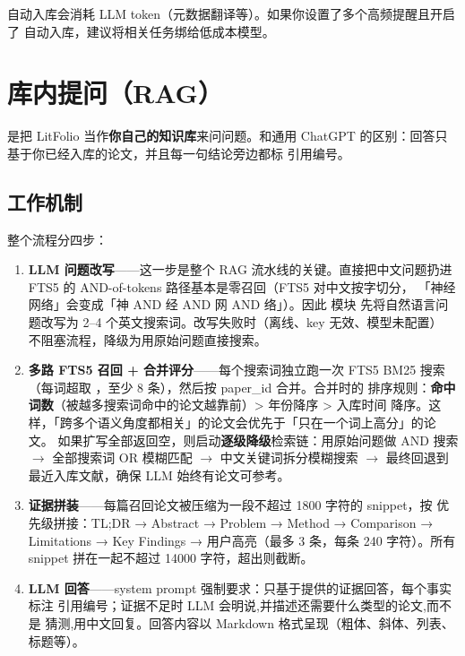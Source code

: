 \begin{warnbox}
自动入库会消耗 LLM token（元数据翻译等）。如果你设置了多个高频提醒且开启了
自动入库，建议将相关任务绑给低成本模型。
\end{warnbox}

\chapter{库内提问（RAG）}
\label{ch:ask}

 是把 LitFolio 当作\textbf{你自己的知识库}来问问题。和通用 ChatGPT
的区别：回答只基于你已经入库的论文，并且每一句结论旁边都标 \cmd{[N]} 引用编号。

\section{工作机制}


整个流程分四步：

\begin{enumerate}
  \item \textbf{LLM 问题改写}——这一步是整个 RAG 流水线的关键。直接把中文问题扔进
    FTS5 的 AND-of-tokens 路径基本是零召回（FTS5  对中文按字切分，
    「神经网络」会变成「神 AND 经 AND 网 AND 络」）。因此  模块
    先将自然语言问题改写为 2--4 个英文搜索词。改写失败时（离线、key 无效、模型未配置）
    不阻塞流程，降级为用原始问题直接搜索。
  \item \textbf{多路 FTS5 召回 + 合并评分}——每个搜索词独立跑一次 FTS5 BM25 搜索
    （每词超取 ，至少 8 条），然后按 paper\_id 合并。合并时的
    排序规则：\textbf{命中词数}（被越多搜索词命中的论文越靠前）> 年份降序 > 入库时间
    降序。这样，「跨多个语义角度都相关」的论文会优先于「只在一个词上高分」的论文。
    如果扩写全部返回空，则启动\textbf{逐级降级}检索链：用原始问题做 AND 搜索
    $\rightarrow$ 全部搜索词 OR 模糊匹配 $\rightarrow$ 中文关键词拆分模糊搜索
    $\rightarrow$ 最终回退到最近入库文献，确保 LLM 始终有论文可参考。
  \item \textbf{证据拼装}——每篇召回论文被压缩为一段不超过 1800 字符的 snippet，按
    优先级拼接：TL;DR → Abstract → Problem → Method → Comparison → Limitations →
    Key Findings → 用户高亮（最多 3 条，每条 240 字符）。所有 snippet 拼在一起不超过
    14000 字符，超出则截断。
  \item \textbf{LLM 回答}——system prompt 强制要求：只基于提供的证据回答，每个事实
    标注 \cmd{[N]} 引用编号；证据不足时 LLM 会明说,并描述还需要什么类型的论文,而不是
    猜测,用中文回复。回答内容以 Markdown 格式呈现（粗体、斜体、列表、标题等）。
\end{enumerate}

